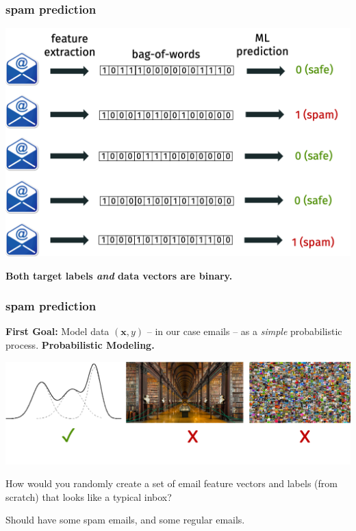 \documentclass[handout,compress]{beamer}
\newcommand{\bv}[1]{\mathbf{#1}}
\begin{document}
\begin{frame}
	\frametitle{spam prediction}
	\begin{center}
		\includegraphics[width=.9\textwidth]{spam.png}
		
		\vspace{.5em}
		\textbf{Both target labels \emph{and} data vectors are binary.}
	\end{center}
\end{frame}

\begin{frame}
	\frametitle{spam prediction}
	\textbf{First Goal:} Model data $(\bv{x},y)$ -- in our case emails -- as a \emph{simple} probabilistic process. \alert{\textbf{Probabilistic Modeling.}}
	
	\begin{center}
		\includegraphics[width=.9\textwidth]{data_dists.png}
		
		How would you randomly create a set of email feature vectors and labels (from scratch) that looks like a typical inbox? 
		
		Should have some spam emails, and some regular emails. 
	\end{center}
\end{frame}
\end{document}
